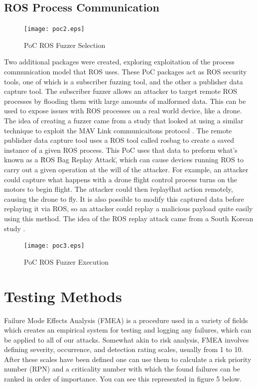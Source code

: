 \documentclass[IEEEtran,letterpaper,10pt,notitlepage,draftclsnofoot]{article}
\begin{document}
\subsection{ROS Process Communication}
\begin{figure}[H]
  \centering
    \texttt{[image: poc2.eps]}
    \caption{PoC ROS Fuzzer Selection}
\end{figure}

Two additional packages were created, exploring exploitation of the process communication model that ROS uses. These PoC packages act as ROS security tools, one of which is a subscriber
fuzzing tool, and the other a publisher data capture tool. The subscriber fuzzer allows an attacker to target remote ROS processes by flooding them with large amounts of malformed data.
This can be used to expose issues with ROS processes on a real world device, like a drone. The idea of creating a fuzzer came from a study that looked at using a similar technique to exploit the MAV Link communicaitons protocol \cite{ROSMAVFuzz}.
The remote publisher data capture tool uses a ROS tool called rosbag to create a saved instance
of a given ROS process. This PoC uses that data to preform what's known as a \"ROS Bag Replay Attack\", which can cause devices running ROS to carry out a given operation at the will of the attacker.
For example, an attacker could capture what happens with a drone flight control process turns on the motors to begin flight. The attacker could then \"replay\" that action remotely, causing the drone
to fly. It is also possible to modify this captured data before replaying it via ROS, so an attacker could replay a malicious payload quite easily using this method. The idea of the ROS replay attack came from a
South Korean study \cite{ROSVulnCounter}.

\begin{figure}[H]
  \centering
    \texttt{[image: poc3.eps]}
    \caption{PoC ROS Fuzzer Execution}
\end{figure}

\section{Testing Methods}
Failure Mode Effects Analysis (FMEA) is a procedure used in a variety of fields which creates an empirical system for testing and logging any failures, which can be applied to all of our attacks. \cite{FMEA}
Somewhat akin to risk analysis, FMEA involves defining severity, occurrence, and detection rating scales, usually from 1 to 10.
After these scales have been defined one can use them to calculate a risk priority number (RPN) and a criticality number with which the found failures can be ranked in order of importance.
You can see this represented in figure 5 below.
\end{document}
